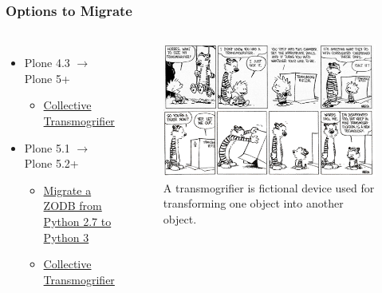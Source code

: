 \documentclass[aspectratio=169]{beamer}
\begin{document}
\begin{frame}
  \frametitle{Options to Migrate}

  \begin{columns}
    \begin{itemize}
      \item Plone 4.3 $\rightarrow$ Plone 5+
      \begin{itemize}
        \item \href{https://github.com/collective/collective.transmogrifier}{Collective Transmogrifier} \pause
      \end{itemize}
      \item Plone 5.1 $\rightarrow$ Plone 5.2+
      \begin{itemize}
        \item \href{https://docs.plone.org/manage/upgrading/version_specific_migration/upgrade_zodb_to_python3.html}{Migrate a ZODB from Python 2.7 to Python 3} \pause
        \item \href{https://github.com/collective/collective.transmogrifier}{Collective Transmogrifier} \pause
      \end{itemize}
    \end{itemize}
    \begin{figure}
      \includegraphics[height=.5\textheight]{./img/002_-_transmogrifier.png}
      \caption{A transmogrifier is fictional device used for transforming one object into another object.}
    \end{figure}
  \end{columns}


\end{frame}
\end{document}
